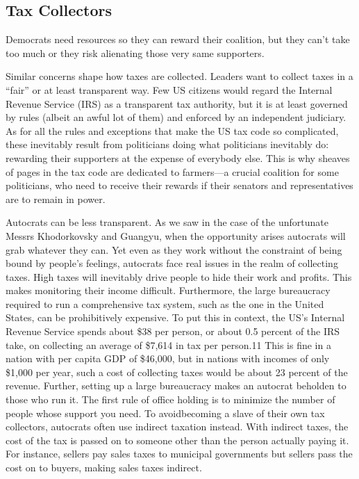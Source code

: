 \documentclass[10pt]{article}
\begin{document}
\subsection{Tax Collectors}

{\large Democrats need resources so they can reward their coalition, but they
can't take too much or they risk alienating those very same supporters.}

{\large Similar concerns shape how taxes are collected. Leaders want to collect
taxes in a ``fair'' or at least transparent way. Few US citizens would regard the
Internal Revenue Service (IRS) as a transparent tax authority, but it is at least
governed by rules (albeit an awful lot of them) and enforced by an independent
judiciary. As for all the rules and exceptions that make the US tax code so
complicated, these inevitably result from politicians doing what politicians
inevitably do: rewarding their supporters at the expense of everybody else. This
is why sheaves of pages in the tax code are dedicated to farmers---a crucial
coalition for some politicians, who need to receive their rewards if their
senators and representatives are to remain in power.}

{\large Autocrats can be less transparent. As we saw in the case of the
unfortunate Messrs Khodorkovsky and Guangyu, when the opportunity arises
autocrats will grab whatever they can. Yet even as they work without the
constraint of being bound by people's feelings, autocrats face real issues in the
realm of collecting taxes. High taxes will inevitably drive people to hide their
work and profits. This makes monitoring their income difficult. Furthermore, the
large bureaucracy required to run a comprehensive tax system, such as the one in
the United States, can be prohibitively expensive. To put this in context, the
US's Internal Revenue Service spends about \$38 per person, or about 0.5 percent
of the IRS take, on collecting an average of \$7,614 in tax per person.11 This is
fine in a nation with per capita GDP of \$46,000, but in nations with incomes of
only \$1,000 per year, such a cost of collecting taxes would be about 23 percent
of the revenue. Further, setting up a large bureaucracy makes an autocrat
beholden to those who run it. The first rule of office holding is to minimize the
number of people whose support you need. To avoidbecoming a slave of their own
tax collectors, autocrats often use indirect taxation instead. With indirect
taxes, the cost of the tax is passed on to someone other than the person actually
paying it. For instance, sellers pay sales taxes to municipal governments but
sellers pass the cost on to buyers, making sales taxes indirect.}
\end{document}

